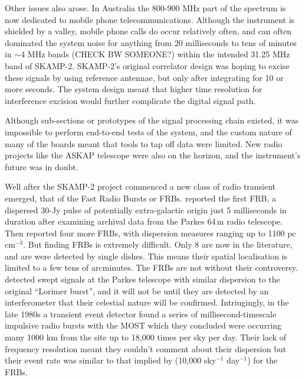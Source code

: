 Other issues also arose. In Australia the 800-900 MHz part of the spectrum is now dedicated to mobile phone telecommunications. Although the instrument is shielded by a valley, mobile phone calls do occur relatively often, and can often dominated the system noise for anything from 20 milliseconds to tens of minutes in $\sim$4 MHz bands (CHECK BW SOMEONE?) within the intended 31.25 MHz band of SKAMP-2. SKAMP-2's original correlator design was hoping to excise these signals by using reference antennae, but only after integrating for 10 or more seconds. The system design meant that higher time resolution for interference excision would further complicate the digital signal path. 

Although sub-sections or prototypes of the signal processing chain existed, it was impossible to perform end-to-end tests of the system, and the custom nature of many of the boards meant that tools to tap off data were limited.  New radio projects like the ASKAP telescope were also on the horizon, and the instrument's future was in doubt.

Well after the SKAMP-2 project commenced a new class of radio transient emerged, that of the Fast Radio Bursts or FRBs. \citep{Lorimer_2007} reported the first FRB, a dispersed 30-Jy pulse of potentially extra-galactic origin just 5 milliseconds in duration after examining archival data from the Parkes 64\,m radio telescope. Then \citep{Thornton_2013} reported four more FRBs, with dispersion measures ranging up to 1100 pc cm$^{-3}$. But finding FRBs is extremely difficult. Only 8 are now in the literature, and are were detected by single dishes. This means their spatial localisation is limited to a few tens of arcminutes. 
The FRBs are not without their controversy. \cite{Burke_Spolaor_2011} detected swept signals at the Parkes telescope with similar dispersion to the original ``Lorimer burst'', and it will not be until they are detected by an interferometer that their celestial nature will be confirmed. Intriugingly, in the late 1980s a transient event detector found a series of millisecond-timescale impulsive radio bursts with the MOST which they concluded were occurring many 1000 km from the site up to 18,000 times per sky per day\cite{Lovell_2008}. Their lack of frequency resolution meant they couldn't comment about their dispersion but their event rate was similar to that implied by \citep{Thornton_2013} (10,000 sky$^{-1}$ day$^{-1}$) for the FRBs.

